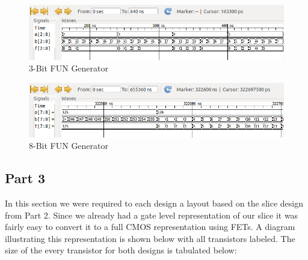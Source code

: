 \documentclass{article}
\begin{document}
\vspace{0.25in}
\begin{figure}[H]
    \centering
    \includegraphics[width=\linewidth]{../part_2/fun_3.png}
    \caption{3-Bit FUN Generator}
\end{figure}
\vspace{0.25in}
\begin{figure}[H]
    \centering
    \includegraphics[width=\linewidth]{../part_2/fun_8.png}
    \caption{8-Bit FUN Generator}
\end{figure}

\newpage
\subsection*{Part 3}

In this section we were required to each design a layout based on the slice
design from Part 2.  Since we already had a gate level representation of our
slice it was fairly easy to convert it to a full CMOS representation using
FETs. A diagram illustrating this representation is shown below with all
transistors labeled. The size of the every transistor for both designs is
tabulated below:
\end{document}
